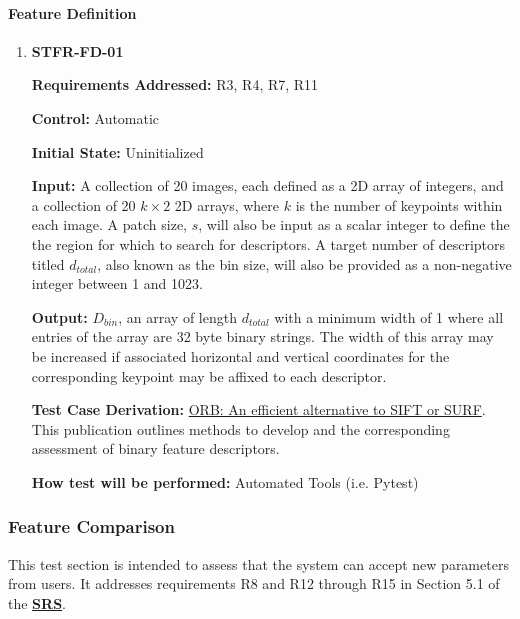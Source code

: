 \documentclass[12pt, titlepage]{article}
\begin{document}
\paragraph{Feature Definition}
\begin{enumerate}
\item \hypertarget{STFR-FD-01}{\textbf{STFR-FD-01}\\}
\textbf{Requirements Addressed:} R3, R4, R7, R11

\textbf{Control:} Automatic

\textbf{Initial State:} Uninitialized

\textbf{Input:} A collection of 20 images, each defined as a 2D array of integers, and a collection of 20 
$k\times 2$ 2D arrays, where $k$ is the number of keypoints within each image. A patch size, $s$, 
will also be input as a scalar integer to define the the region for which to search for descriptors. A target 
number of descriptors titled $d_{total}$, also known as the bin size, will also be provided as a non-negative integer 
between 1 and 1023.

\textbf{Output:} $D_{bin}$, an array of length $d_{total}$ with a minimum width of 1 where all entries of the array are 32 byte binary strings. The width of this array may be increased if associated horizontal and vertical coordinates for the corresponding keypoint may be affixed to each descriptor. 

\textbf{Test Case Derivation:} \href{https://sites.cc.gatech.edu/classes/AY2024/cs4475_summer/images/ORB_an_efficient_alternative_to_SIFT_or_SURF.pdf}
{ORB: An efficient alternative to SIFT or SURF}. This publication outlines methods 
to develop and the corresponding assessment of binary feature descriptors.

\textbf{How test will be performed:} Automated Tools (i.e. Pytest)
\end{enumerate}

\subsubsection{Feature Comparison}

This test section is intended to assess that the system can accept new parameters from users. It addresses 
requirements R8 and R12 through R15 in Section 5.1 of the 
\textbf{\href{https://github.com/KiranSingh15/CAS-741-Image-Correspondences/blob/main/docs/SRS/SRS.pdf}
{SRS}}. 
		
\end{document}
